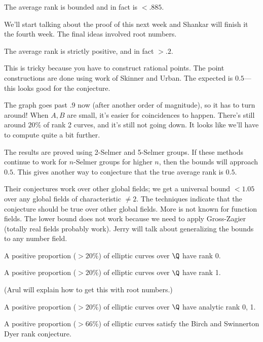 \begin{thm}
The average rank is bounded and in fact is $<.885$.
\end{thm}
We'll start talking about the proof of this next week and Shankar will finish it the fourth week. The final ideas involved root numbers.
\begin{thm}
The average rank is strictly positive, and in fact $>.2$.
\end{thm}
This is tricky because you have to construct rational points. The point constructions are done using work of Skinner and Urban. The expected is $0.5$---this looks good for the conjecture.

The graph goes past $.9$ now (after another order of magnitude), so it has to turn around! 
When $A,B$ are small, it's easier for coincidences to happen. There's still around $20\%$ of rank 2 curves, and it's still not going down. It looks like we'll have to compute quite a bit further.

The results are proved using 2-Selmer and 5-Selmer groups. If these methods continue to work for $n$-Selmer groups for higher $n$, then the bounds will approach $0.5$. This gives another way to conjecture that the true average rank is $0.5$.


Their conjectures work over other global fields; we get a universal bound $<1.05$ over any global fields of characteristic $\ne2$. The techniques indicate that the conjecture should be true over other global fields. More is not known for function fields. The lower bound does not work because we need to apply Gross-Zagier (totally real fields probably work). Jerry will talk about generalizing the bounds to any number field.


\begin{cor}[of proof]
A positive proportion ($>20\%$) of elliptic curves over $\Q$ have rank 0.
\end{cor}

\begin{cor}[of proof]
A positive proportion ($>20\%$) of elliptic curves over $\Q$ have rank 1.
\end{cor}
(Arul will explain how to get this with root numbers.)

\begin{cor}
A positive proportion ($>20\%$) of elliptic curves over $\Q$ have analytic rank 0, 1.
\end{cor}
\begin{thm}
A positive proportion ($>66\%$) of elliptic curves satisfy the Birch and Swinnerton Dyer rank conjecture.
\end{thm}

